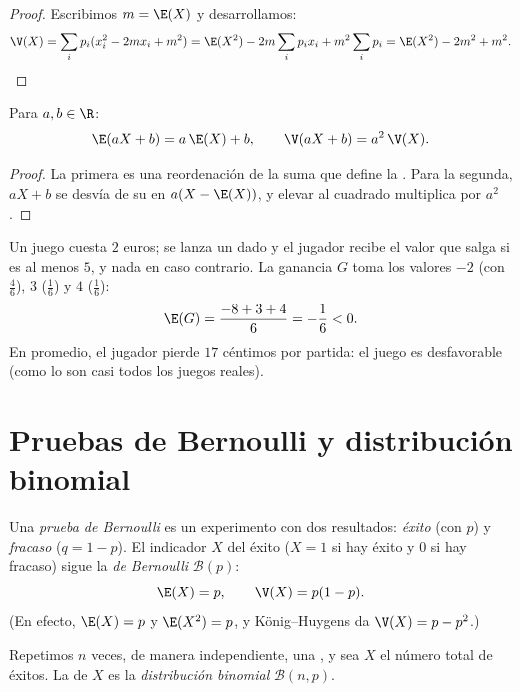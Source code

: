 \begin{proof}
Escribimos $m = \E(X)$ y desarrollamos:
\[
\V(X) = \sum_i p_i (x_i^2 - 2m x_i + m^2)
= \E(X^2) - 2m\sum_i p_i x_i + m^2\sum_i p_i
= \E(X^2) - 2m^2 + m^2 . \qedhere
\]
\end{proof}

\begin{proposition}\label{prop:g12:randvar:affine}
Para $a, b \in \R$:
\[
\E(aX + b) = a\,\E(X) + b, \qquad
\V(aX + b) = a^2\,\V(X) .
\]
\end{proposition}

\begin{proof}
La primera es una reordenación de la suma que define la . Para la
segunda, $aX + b$ se desvía de su  en $a(X - \E(X))$, y elevar al
cuadrado multiplica por $a^2$.
\end{proof}

\begin{example}\label{ex:g12:randvar:game}
Un juego cuesta $2$ euros; se lanza un dado y el jugador recibe el valor
que salga si es al menos $5$, y nada en caso contrario. La ganancia $G$
toma los valores $-2$ (con  $\frac46$), $3$ ($\frac16$) y $4$
($\frac16$):
\[
\E(G) = \frac{-8 + 3 + 4}{6} = -\frac{1}{6} < 0 .
\]
En promedio, el jugador pierde $17$ céntimos por partida: el juego es
desfavorable (como lo son casi todos los juegos reales).
\end{example}

\section{Pruebas de Bernoulli y distribución binomial}

\begin{definition}\label{def:g12:randvar:bernoulli}
Una \emph{prueba de Bernoulli} es un
experimento con dos resultados: \emph{éxito} (con  $p$) y
\emph{fracaso} ($q = 1 - p$). El indicador $X$ del éxito ($X = 1$ si hay
éxito y $0$ si hay fracaso) sigue la \emph{ de Bernoulli}
$\mathcal B(p)$:
\[
\E(X) = p, \qquad \V(X) = p(1-p) .
\]
(En efecto, $\E(X) = p$ y $\E(X^2) = p$, y König--Huygens da
$\V(X) = p - p^2$.)
\end{definition}

\begin{definition}\label{def:g12:randvar:binomial}
Repetimos $n$ veces, de manera independiente, una , y
sea $X$ el número total de éxitos. La  de $X$ es la
\emph{distribución binomial}
$\mathcal B(n, p)$.
\end{definition}

